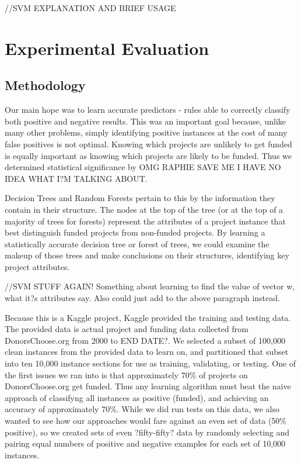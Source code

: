 \documentclass{article}
\begin{document}
//SVM EXPLANATION AND BRIEF USAGE


\section{Experimental Evaluation}
\subsection{Methodology}
Our main hope was to learn accurate predictors - rules able to correctly classify both positive and negative results. This was an important goal because, unlike many other problems, simply identifying positive instances at the cost of many false positives is not optimal. Knowing which projects are unlikely to get funded is equally important as knowing which projects are likely to be funded. Thus we determined statistical significance by OMG RAPHIE SAVE ME I HAVE NO IDEA WHAT I?M TALKING ABOUT. 

Decision Trees and Random Forests pertain to this by the information they contain in their structure. The nodes at the top of the tree (or at the top of a majority of trees for forests) represent the attributes of a project instance that best distinguish funded projects from non-funded projects. By learning a statistically accurate decision tree or forest of trees, we could examine the makeup of those trees and make conclusions on their structures, identifying key project attributes.

//SVM STUFF AGAIN! Something about learning to find the value of vector w, what it?s attributes say. Also could just add to the above paragraph instead.

Because this is a Kaggle project, Kaggle provided the training and testing data. The provided data is actual project and funding data collected from DonorsChoose.org from 2000 to END DATE?. We selected a subset of 100,000 clean instances from the provided data to learn on, and partitioned that subset into ten 10,000 instance sections for use as training, validating, or testing. One of the first issues we ran into is that approximately 70\% of projects on DonorsChoose.org get funded. Thus any learning algorithm must beat the naive approach of classifyng all instances as positive (funded), and achieving an accuracy of approximately 70\%. While we did run tests on this data, we also wanted to see how our approaches would fare against an even set of data (50\% positive), so we created sets of even ?fifty-fifty? data by randomly selecting and pairing equal numbers of positive and negative examples for each set of 10,000 instances.
\end{document}
